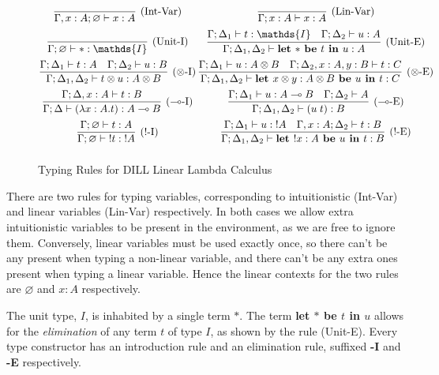 \documentclass[]{unswthesis}
\let\emptyset\varnothing
\newcommand{\lolly}{\multimap}
\newcommand{\types}{\vdash}
\newcommand{\letbe}[3]{\textbf{let $#1$ be $#2$ in $#3$}}
\let\i\textit
\let\b\textbf
\begin{document}
\begin{figure}[h]
\caption{Typing Rules for DILL Linear Lambda Calculus}
\begin{displaymath}
\arraycolsep=1.4pt\def\arraystretch{2.2}
\begin{array}{cc}
\infer[\text{(Int-Var)}]{\Gamma, x : A; \emptyset \types x : A}{} &
\infer[\text{(Lin-Var)}]{\Gamma; x : A \types x : A}{} \\
\infer[\text{(Unit-I)}]{\Gamma; \emptyset \types * : \mathds{I}}{} &
\infer[\text{(Unit-E)}]
  {\Gamma; \Delta_1, \Delta_2 \types \letbe{*}{t}{u} : A}
  {\Gamma; \Delta_1 \types t : \mathds{I}  &  \Gamma; \Delta_2 \types u : A} \\
\infer[\text{($\otimes$-I)}]
  {\Gamma; \Delta_1, \Delta_2 \types t \otimes u : A \otimes B}
  {\Gamma; \Delta_1 \types t : A  &  \Gamma; \Delta_2 \types u : B} &
\infer[\text{($\otimes$-E)}]
  {\Gamma; \Delta_1, \Delta_2 \types \letbe{x \otimes y : A \otimes B}{u}{t} : C}
  {\Gamma; \Delta_1 \types u : A \otimes B  &  \Gamma; \Delta_2, x : A, y : B \types t : C} \\
\infer[\text{($\lolly$-I)}]
  {\Gamma; \Delta \types (\lambda x : A. t) : A \lolly B}
  {\Gamma; \Delta, x : A \types t : B} &
\infer[\text{($\lolly$-E)}]
  {\Gamma; \Delta_1, \Delta_2 \types (u \; t) : B}
  {\Gamma; \Delta_1 \types u : A \lolly B  &  \Gamma; \Delta_2 \types A} \\
\infer[\text{(!-I)}]
  {\Gamma; \emptyset \types {!t} : {!A}}
  {\Gamma; \emptyset \types t : A} &
\infer[\text{(!-E)}]
  {\Gamma; \Delta_1, \Delta_2 \types \letbe{!x : A}{u}{t} : B}
  {\Gamma; \Delta_1 \types u : {!A}  &  \Gamma, x : A; \Delta_2 \types t : B} \\
\end{array}
\end{displaymath}
\end{figure}

There are two rules for typing variables, corresponding to intuitionistic (Int-Var) and linear variables (Lin-Var) respectively. In both cases we allow extra intuitionistic variables to be present in the environment, as we are free to ignore them. Conversely, linear variables must be used exactly once, so there can't be any present when typing a non-linear variable, and there can't be any extra ones present when typing a linear variable. Hence the linear contexts for the two rules are $\emptyset$ and $x : A$ respectively.

The unit type, $I$, is inhabited by a single term $*$. The term \b{let $*$ be $t$ in $u$} allows for the \i{elimination} of any term $t$ of type $I$, as shown by the rule (Unit-E). Every type constructor has an introduction rule and an elimination rule, suffixed \b{-I} and \b{-E} respectively.
\end{document}
